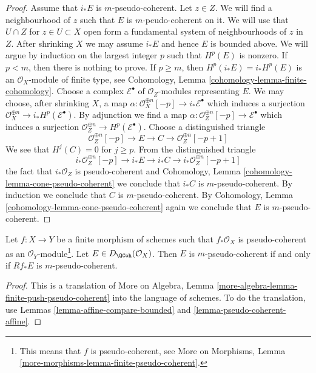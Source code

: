 \begin{proof}
\medskip\noindent
Assume that $i_*E$ is $m$-pseudo-coherent. Let $z \in Z$.
We will find a neighbourhood of $z$ such that $E$
is $m$-peudo-coherent on it. We will use
that $U \cap Z$ for $z \in U \subset X$ open form a fundamental system of
neighbourhoods of $z$ in $Z$. After shrinking $X$ we may assume $i_*E$
and hence $E$ is bounded above. We will argue by induction on
the largest integer $p$ such that $H^p(E)$ is nonzero. If $p < m$, then
there is nothing to prove. If $p \geq m$, then $H^p(i_*E) = i_*H^p(E)$
is an $\mathcal{O}_X$-module of finite type, see
Cohomology, Lemma \ref{cohomology-lemma-finite-cohomology}.
Choose a complex $\mathcal{E}^\bullet$ of $\mathcal{O}_Z$-modules
representing $E$. We may choose, after shrinking $X$,
a map $\alpha : \mathcal{O}_X^{\oplus n}[-p] \to i_*\mathcal{E}^\bullet$
which induces a surjection
$\mathcal{O}_X^{\oplus n} \to i_*H^p(\mathcal{E}^\bullet)$.
By adjunction we find a map
$\alpha : \mathcal{O}_Z^{\oplus n}[-p] \to \mathcal{E}^\bullet$
which induces a surjection
$\mathcal{O}_Z^{\oplus n} \to H^p(\mathcal{E}^\bullet)$.
Choose a distinguished triangle
$$
\mathcal{O}_Z^{\oplus n}[-p] \to E \to C \to \mathcal{O}_Z^{\oplus n}[-p + 1]
$$
We see that $H^j(C) = 0$ for $j \geq p$. From the distinguished triangle
$$
i_*\mathcal{O}_Z^{\oplus n}[-p] \to i_*E \to i_*C \to
i_*\mathcal{O}_Z^{\oplus n}[-p + 1]
$$
the fact that $i_*\mathcal{O}_Z$ is pseudo-coherent
and 
Cohomology, Lemma \ref{cohomology-lemma-cone-pseudo-coherent}
we conclude that $i_*C$ is $m$-pseudo-coherent.
By induction we conclude that $C$ is $m$-pseudo-coherent.
By Cohomology, Lemma \ref{cohomology-lemma-cone-pseudo-coherent}
again we conclude that $E$ is $m$-pseudo-coherent.
\end{proof}

\begin{lemma}
\label{lemma-finite-push-pseudo-coherent}
Let $f : X \to Y$ be a finite morphism of schemes such that
$f_*\mathcal{O}_X$ is pseudo-coherent as an
$\mathcal{O}_Y$-module\footnote{This means that $f$ is pseudo-coherent, see
More on Morphisms, Lemma
\ref{more-morphisms-lemma-finite-pseudo-coherent}.}.
Let $E \in D_\QCoh(\mathcal{O}_X)$. Then $E$ is $m$-pseudo-coherent
if and only if $Rf_*E$ is $m$-pseudo-coherent.
\end{lemma}

\begin{proof}
This is a translation of
More on Algebra, Lemma \ref{more-algebra-lemma-finite-push-pseudo-coherent}
into the language of schemes. To do the translation, use
Lemmas \ref{lemma-affine-compare-bounded} and
\ref{lemma-pseudo-coherent-affine}.
\end{proof}


